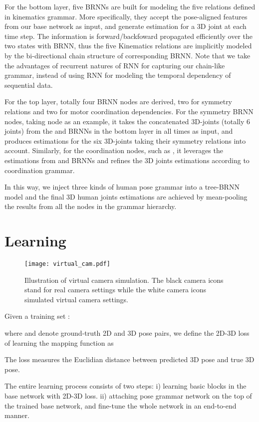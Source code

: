 \documentclass[letterpaper]{article} \usepackage{aaai18}  \usepackage{times}  \usepackage{helvet}  \usepackage{courier}  \usepackage{url}  \usepackage{color}
\begin{document}
For the bottom layer, five BRNNs are built for modeling the five relations defined in kinematics grammar. More specifically, they accept the pose-aligned features from our base network as input, and generate estimation for a 3D joint at each time step. The information is forward/backfoward propagated efficiently over the two states with BRNN, thus the five Kinematics relations are implicitly modeled by the bi-directional chain structure of corresponding BRNN. Note that we take the advantages of recurrent natures of RNN for capturing our chain-like grammar, instead of using RNN for modeling the temporal dependency of sequential data.

For the top layer, totally four BRNN nodes are derived, two for symmetry relations and two for motor coordination dependencies. For the symmetry BRNN nodes, taking  node as an example, it takes the concatenated 3D-joints (totally 6 joints) from the  and  BRNNs in the bottom layer in all times as input, and produces estimations for the six 3D-joints taking their symmetry relations into account. Similarly, for the coordination nodes, such as , it leverages the estimations from  and  BRNNs and refines the 3D joints estimations according to coordination grammar.

In this way, we inject three kinds of human pose grammar into a tree-BRNN model and the final 3D human joints estimations are achieved by mean-pooling the results from all the nodes in the grammar hierarchy.


\section{Learning} \label{sec:learn}

\begin{figure}[ptb]
\centering
\texttt{[image: virtual\_cam.pdf]}
\caption{Illustration of virtual camera simulation. The black camera icons stand for real camera settings while the white camera icons simulated virtual camera settings.}
\label{fig:camera}
\end{figure}

Given a training set :

where  and  denote ground-truth 2D and 3D pose pairs, we define the 2D-3D loss of learning the mapping function  as

The loss measures the Euclidian distance between predicted 3D pose and true 3D pose.

The entire learning process consists of two steps: i) learning basic blocks in the base network with 2D-3D loss.
ii) attaching pose grammar network on the top of the trained base network, and fine-tune the whole network in an end-to-end manner.
\end{document}
